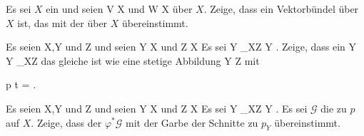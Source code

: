 {}
{





Es sei $X$ ein
und seien
 { V } { X
} {}
und
 { W } { X
} {}
über $X$. Zeige, dass
 {} {}
ein Vektorbündel über $X$ ist, das mit der
über $X$ übereinstimmt.





}
{} {}

{}
{





Es seien
\mathkor {} {X,Y} {und} {Z} {}
und seien
\maabb {\varphi} { Y } { X
} {}
und
 { Z } { X
} {}
Es sei
 {Y \times_XZ } { Y
} {.}
Zeige, dass ein
 { Y } { Y \times_XZ
} {}
das gleiche ist wie eine stetige Abbildung
 { Y } { Z
} {}
mit

\mavergleichskette
{\vergleichskette
{ p \circ t
}
{ = }{ \varphi
}
{  }{
}
{    }{
}
{   }{
}
}
{}{}{.}





}
{} {}

{}
{





Es seien
\mathkor {} {X,Y} {und} {Z} {}
und seien
\maabb {\varphi} { Y } { X
} {}
und
 { Z } { X
} {}
Es sei
 {Y \times_XZ } { Y
} {.}
Es sei ${ \mathcal  G   }$ die
zu $p$ auf $X$. Zeige, dass der
$\varphi^*{ \mathcal  G   }$ mit der Garbe der Schnitte zu $p_Y$ übereinstimmt.





}
{} {}
